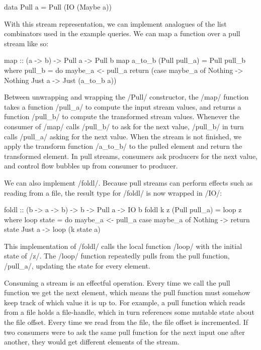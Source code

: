 \begin{haskell}
data Pull a = Pull (IO (Maybe a))
\end{haskell}

With this stream representation, we can implement analogues of the list combinators used in the example queries.
We can map a function over a pull stream like so:

\begin{haskell}
map :: (a -> b) -> Pull a -> Pull b
map a_to_b (Pull pull_a) = Pull pull_b
 where
  pull_b = do
    maybe_a <- pull_a
    return (case maybe_a of
             Nothing -> Nothing
             Just a  -> Just (a_to_b a))
\end{haskell}

Between unwrapping and wrapping the \Hs/Pull/ constructor, the \Hs/map/ function takes a function \Hs/pull_a/ to compute the input stream values, and returns a function \Hs/pull_b/ to compute the transformed stream values.
Whenever the consumer of \Hs/map/ calls \Hs/pull_b/ to ask for the next value, \Hs/pull_b/ in turn calls \Hs/pull_a/ asking for the next value.
When the stream is not finished, we apply the transform function \Hs/a_to_b/ to the pulled element and return the transformed element.
In pull streams, consumers ask producers for the next value, and control flow bubbles up from consumer to producer.

We can also implement \Hs/foldl/.
Because pull streams can perform effects such as reading from a file, the result type for \Hs/foldl/ is now wrapped in \Hs/IO/:

\begin{haskell}
foldl :: (b -> a -> b) -> b -> Pull a -> IO b
foldl k z (Pull pull_a) = loop z
 where
  loop state = do
    maybe_a <- pull_a
    case maybe_a of
      Nothing -> return state
      Just a -> loop (k state a)
\end{haskell}

This implementation of \Hs/foldl/ calls the local function \Hs/loop/ with the initial state of \Hs/z/.
The \Hs/loop/ function repeatedly pulls from the pull function, \Hs/pull_a/, updating the state for every element.

Consuming a stream is an effectful operation.
Every time we call the pull function we get the next element, which means the pull function must somehow keep track of which value it is up to.
For example, a pull function which reads from a file holds a file-handle, which in turn references some mutable state about the file offset.
Every time we read from the file, the file offset is incremented.
If two consumers were to ask the same pull function for the next input one after another, they would get different elements of the stream.



